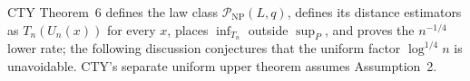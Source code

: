 CTY Theorem~6 defines the law class \(\mathcal P_{\mathrm{NP}}(L,q)\), defines its distance estimators as \(T_n(U_n(x))\) for every \(x\), places \(\inf_{T_n}\) outside \(\sup_P\), and proves the \(n^{-1/4}\) lower rate; the following discussion conjectures that the uniform factor \(\log^{1/4}n\) is unavoidable.  CTY's separate uniform upper theorem assumes Assumption~2.